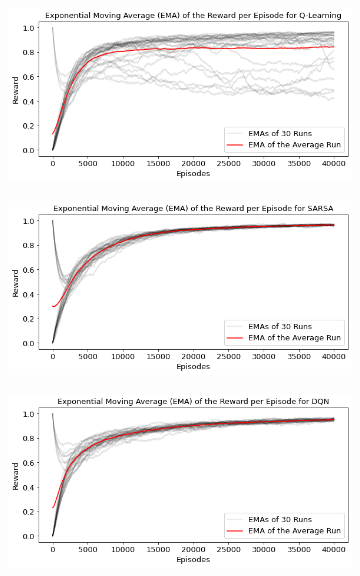 \documentclass[conference]{IEEEtran}
\begin{document}
\begin{figure}[htbp!]
    \centering
    \begin{subfigure}[]{.45\textwidth}
        \centering
        \includegraphics[width=\textwidth]{../figures/rewards_30_runs_qlearning.png}
        \caption{}
    \end{subfigure}
    \begin{subfigure}[]{.45\textwidth}
        \centering
        \includegraphics[width=\textwidth]{../figures/rewards_30_runs_sarsa.png}
        \caption{}
    \end{subfigure}
    \begin{subfigure}[]{.45\textwidth}
        \centering
        \includegraphics[width=\textwidth]{../figures/rewards_30_runs_dqn.png}
        \caption{}
    \end{subfigure}
    \caption{}
    \label{fig:30runs_reward}
\end{figure}
    
\end{document}
